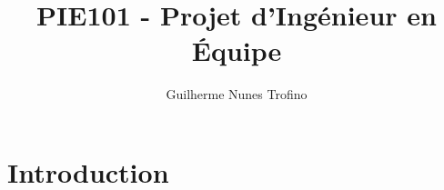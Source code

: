 \documentclass{article}
\title{PIE101 - Projet d'Ingénieur en Équipe}
\author{Guilherme Nunes Trofino}
\begin{document}
\maketitle

\newpage\tableofcontents

\section{Introduction}
\end{document}
